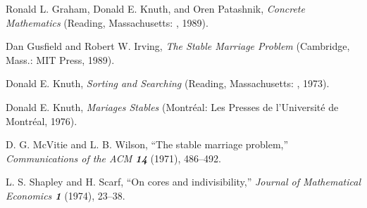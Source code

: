 \smallskip
\bib
[\cm]
Ronald L. Graham, Donald E. Knuth, and Oren Patashnik, {\sl Concrete
Mathematics\/} (Reading, Massachusetts: \AW, 1989).

\smallskip
\bib
[\gi]
Dan Gusfield and Robert W. Irving, {\sl The Stable Marriage Problem\/}
(Cambridge, Mass.: MIT Press, 1989).

\smallskip
\bib
[\ks]
Donald E. Knuth, {\sl Sorting and Searching\/} (Reading, Massachusetts:
\AW, 1973).

\smallskip
\bib
[\ms]
Donald E. Knuth, {\sl Mariages Stables\/} (Montr\'eal: Les Presses de
l'Universit\'e de Montr\'eal, 1976).

\smallskip
\bib
[\mw]
D. G. McVitie and L. B. Wilson, ``The stable marriage problem,'' {\sl
Communications of the ACM\/ \bf 14} (1971), 486--492.

\smallskip
\bib
[\ss]
L. S. Shapley and H. Scarf, ``On cores and indivisibility,'' {\sl Journal of
Mathematical Economics\/ \bf 1} (1974), 23--38.


\bye


